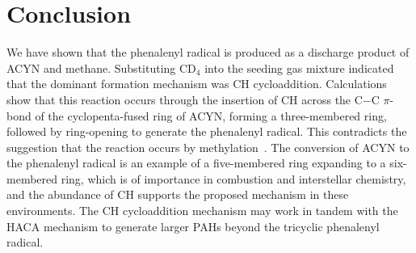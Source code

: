 \documentclass[journal=jacsat,manuscript=article,layout=onecolumn]{achemso}
\begin{document}



\section{Conclusion}

We have shown that the phenalenyl radical is produced as a discharge product of ACYN and methane. Substituting CD$_4$ into the seeding gas mixture indicated that the dominant formation mechanism was CH cycloaddition. Calculations show that this reaction occurs through the insertion of CH across the C$-$C $\pi$-bond of the cyclopenta-fused ring of ACYN, forming a three-membered ring, followed by ring-opening to generate the phenalenyl radical. This contradicts the suggestion that the reaction occurs by methylation~\cite{por20}. The conversion of ACYN to the phenalenyl radical is an example of a five-membered ring expanding to a six-membered ring, which is of importance in combustion and interstellar chemistry, and the abundance of CH supports the proposed mechanism in these environments. The CH cycloaddition mechanism may work in tandem with the HACA mechanism to generate larger PAHs beyond the tricyclic phenalenyl radical.
\end{document}
